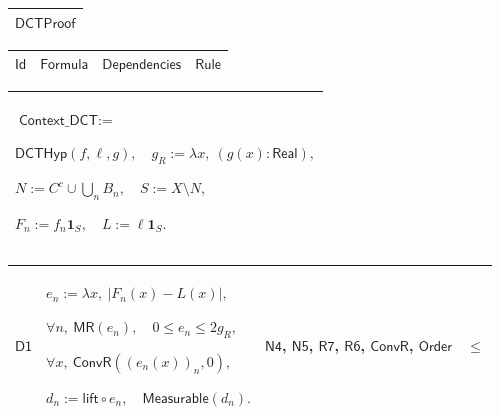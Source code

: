 \documentclass[11pt]{amsart}
\renewcommand{\arraystretch}{1.4}
\newlength{\FTCOneColumnBody}
\newlength{\FTCFourColumnBody}
\begin{document}
{\centering
\renewcommand{\arraystretch}{1.4}
\par\setlength{\parskip}{0pt}\nointerlineskip
\noindent
\begin{tabular}{|@{}>{\centering\arraybackslash}m{\FTCOneColumnBody}|}\hline
$\displaystyle \textsf{DCTProof}$\\ \hline
\end{tabular}%
\par\setlength{\parskip}{0pt}\nointerlineskip
\noindent
\begin{tabular}{|@{}>{\centering\arraybackslash}m{0.078431\FTCFourColumnBody}|>{\centering\arraybackslash}m{0.535947\FTCFourColumnBody}|>{\centering\arraybackslash}m{0.281045\FTCFourColumnBody}|>{\centering\arraybackslash}m{0.104575\FTCFourColumnBody}|}\hline
$\displaystyle \textsf{Id}$ & $\displaystyle \textsf{Formula}$ & $\displaystyle \textsf{Dependencies}$ & $\displaystyle \textsf{Rule}$\\ \hline
\end{tabular}%
\par\setlength{\parskip}{0pt}\nointerlineskip
\noindent
\begin{tabular}{|@{}>{\centering\arraybackslash}m{\FTCOneColumnBody}|}\hline
$\displaystyle \textsf{Context\_DCT}:=$\par
$\displaystyle \textsf{DCTHyp}(f,\ell,g),\quad g_R:=\lambda x,\ (g(x):\textsf{Real}),$\par
$\displaystyle N:=C^c\cup\bigcup_n B_n,\quad S:=X\setminus N,$\par
$\displaystyle F_n:=f_n\mathbf1_S,\quad L:=\ell\mathbf1_S.$\\ \hline
\end{tabular}%
\par\setlength{\parskip}{0pt}\nointerlineskip
\noindent
\begin{tabular}{|@{}>{\centering\arraybackslash}m{0.078431\FTCFourColumnBody}|>{\centering\arraybackslash}m{0.535947\FTCFourColumnBody}|>{\centering\arraybackslash}m{0.281045\FTCFourColumnBody}|>{\centering\arraybackslash}m{0.104575\FTCFourColumnBody}|}\hline
\hypertarget{dct:D1}{$\displaystyle \textsf{D1}$} & $\displaystyle e_n:=\lambda x,\ |F_n(x)-L(x)|,$\par
$\displaystyle \forall n,\ \textsf{MR}(e_n),\quad0\le e_n\le2g_R,$\par
$\displaystyle \forall x,\ \textsf{ConvR}((e_n(x))_n,0),$\par
$\displaystyle d_n:=\textsf{lift}\circ e_n,\quad\textsf{Measurable}(d_n).$ & \hyperlink{dct:N4}{$\displaystyle \textsf{N4}$}, \hyperlink{dct:N5}{$\displaystyle \textsf{N5}$}, \hyperlink{dct:R7}{$\displaystyle \textsf{R7}$}, \hyperlink{dct:R6}{$\displaystyle \textsf{R6}$}, \hyperlink{dctdef:ConvR}{$\displaystyle \textsf{ConvR}$}, \hyperlink{ax:Order}{$\displaystyle \textsf{Order}$} & $\displaystyle \le$\\ \hline

\end{tabular}}
\end{document}
